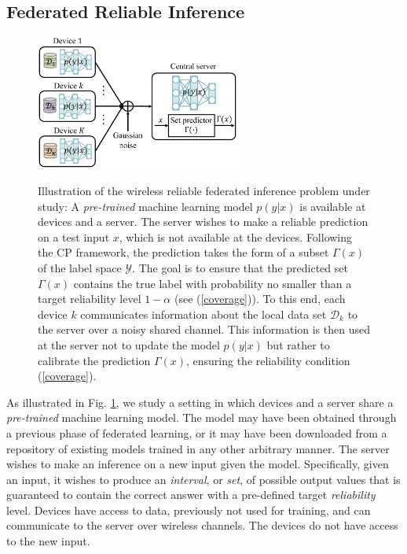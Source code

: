 \documentclass[12pt, draftclsnofoot, onecolumn]{IEEEtran}
\begin{document}
\subsection{Federated Reliable Inference}\label{Federated_inference}
\begin{figure}[t]
    \centering
    {\includegraphics[width = 0.6\textwidth]{./figures/setting.pdf}}
    \caption{Illustration of the wireless reliable federated inference problem under study: A \emph{pre-trained} machine learning model $p(y|x)$ is available at devices and a server. The server wishes to make a reliable prediction on a test input $x$, which is not available at the devices. Following the CP framework, the prediction takes the form of a subset $\Gamma(x)$ of the label space $\mathcal{Y}$. The goal is to ensure that the predicted set $\Gamma(x)$ contains the true label with probability no smaller than a target reliability level $1-\alpha$ (see (\ref{coverage})). To this end,  each device $k$ communicates information about the local data set $\mathcal{D}_k$ to the server over a noisy shared channel. This information is then used at the server not to update the model $p(y|x)$ but rather to calibrate the prediction $\Gamma(x)$, ensuring the reliability condition (\ref{coverage}).
    }
    \label{Fig_setting}
\end{figure}

As illustrated in Fig. \ref{Fig_setting},  we study a setting in which devices and a server share a \emph{pre-trained} machine learning model. The model may have been obtained through a previous phase of federated learning, or it may have been downloaded from a repository of existing models trained in any other arbitrary manner. The server wishes to make an inference on a new input given the model. Specifically, given an input, it wishes to produce an \emph{interval}, or \emph{set}, of possible output values that is guaranteed to contain the correct answer with a pre-defined target \emph{reliability} level. Devices have access to data, previously not  used for training, and can communicate to the server over wireless channels. The devices do not have access to the new input. 
\end{document}
